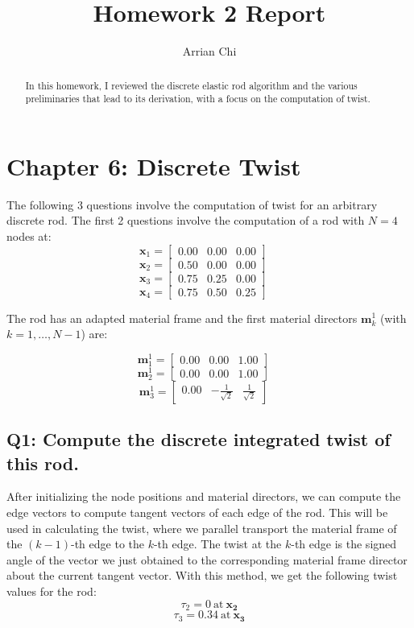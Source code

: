 \documentclass[letterpaper, 10 pt, conference]{ieeeconf}  %
\title{\LARGE \bf
Homework 2 Report
}
\author{Arrian Chi%
}
\begin{document}
\onecolumn


\maketitle
\thispagestyle{empty}
\pagestyle{empty}



\begin{abstract}

In this homework, I reviewed the discrete elastic rod algorithm and the various preliminaries that lead to its derivation, with a focus on the computation of twist. 

\end{abstract}
\section{Chapter 6: Discrete Twist}
The following 3 questions involve the computation of twist for an arbitrary discrete rod. The first 2 questions involve the computation of a rod with $ N = 4 $ nodes at:
\[ \mathbf{x}_1 = \begin{bmatrix} 0.00 & 0.00 & 0.00 \end{bmatrix} \quad \]
\[ \mathbf{x}_2 = \begin{bmatrix} 0.50 & 0.00 & 0.00 \end{bmatrix} \quad \]
\[ \mathbf{x}_3 = \begin{bmatrix} 0.75 & 0.25 & 0.00 \end{bmatrix} \quad \]
\[ \mathbf{x}_4 = \begin{bmatrix} 0.75 & 0.50 & 0.25 \end{bmatrix} \quad \]


The rod has an adapted material frame and the first material directors \( \mathbf{m}_k^1 \) (with \( k = 1, \ldots, N-1 \)) are:


\[\mathbf{m}_1^1 = \begin{bmatrix} 0.00 & 0.00 & 1.00 \end{bmatrix} \quad \]
\[\mathbf{m}_2^1 = \begin{bmatrix} 0.00 & 0.00 & 1.00 \end{bmatrix} \quad \]
\[\mathbf{m}_3^1 = \begin{bmatrix} 0.00 & -\frac{1}{\sqrt{2}} & \frac{1}{\sqrt{2}} \end{bmatrix} \quad \]


\subsection*{Q1: Compute the discrete integrated twist of this rod.}
After initializing the node positions and material directors, we can compute the edge vectors to compute tangent vectors of each edge of the rod. This will be used in calculating the twist, where we parallel transport the material frame of the $(k -1)$-th edge to the $k$-th edge. The twist at the $k$-th edge is the signed angle of the vector we just obtained to the corresponding material frame director about the current tangent vector. With this method, we get the following twist values for the rod:
\[ \tau_2 = 0 \ \text{at} \ \mathbf{x_2}\]
\[\tau_3 = 0.34\ \text{at} \ \mathbf{x_3} \]
\end{document}
